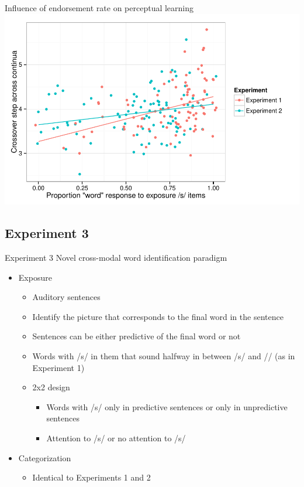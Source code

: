 \documentclass{beamer}
\begin{document}
\begin{frame}{Influence of endorsement rate on perceptual learning}
\includegraphics[width=\textwidth]{graphs/exp12_xoverwordresp_present.pdf}
\end{frame}

\subsection{Experiment 3}

\begin{frame}{Experiment 3}
Novel cross-modal word identification paradigm
\begin{itemize}
\item Exposure
\begin{itemize}
\item Auditory sentences
\item Identify the picture that corresponds to the final word in the sentence
\item Sentences can be either predictive of the final word or not
\item Words with /s/ in them that sound halfway in between /s/ and /\textesh/ (as in Experiment 1)
\item 2x2 design
\begin{itemize}
\item Words with /s/ only in predictive sentences or only in unpredictive sentences
\item Attention to /s/ or no attention to /s/
\end{itemize}
\end{itemize}
\item Categorization
\begin{itemize}
\item Identical to Experiments 1 and 2
\end{itemize}
\end{itemize}
\end{frame}
\end{document}
